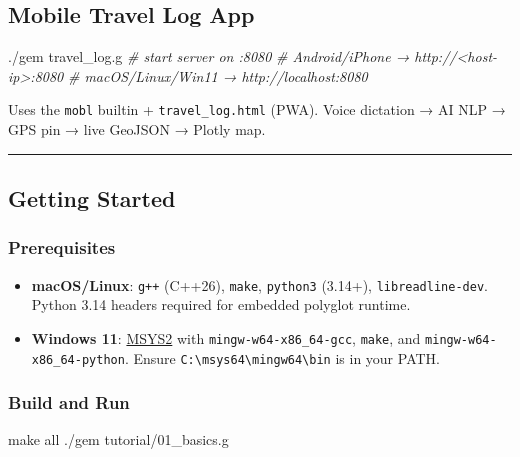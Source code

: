 \documentclass[
]{article}
\newenvironment{Shaded}{}{}
\newcommand{\CommentTok}[1]{\textcolor[rgb]{0.38,0.63,0.69}{\textit{#1}}}
\newcommand{\ExtensionTok}[1]{#1}
\newcommand{\FunctionTok}[1]{\textcolor[rgb]{0.02,0.16,0.49}{#1}}
\newcommand{\NormalTok}[1]{#1}
\providecommand{\tightlist}{%
  \setlength{\itemsep}{0pt}\setlength{\parskip}{0pt}}
\begin{document}
\subsection{Mobile Travel Log App}\label{mobile-travel-log-app}

\begin{Shaded}
\begin{Highlighting}[]
\ExtensionTok{./gem}\NormalTok{ travel\_log.g          }\CommentTok{\# start server on :8080}
\CommentTok{\# Android/iPhone → http://\textless{}host{-}ip\textgreater{}:8080}
\CommentTok{\# macOS/Linux/Win11 → http://localhost:8080}
\end{Highlighting}
\end{Shaded}

Uses the \texttt{mobl} builtin + \texttt{travel\_log.html} (PWA). Voice
dictation → AI NLP → GPS pin → live GeoJSON → Plotly map.

\begin{center}\rule{0.5\linewidth}{0.5pt}\end{center}

\subsection{Getting Started}\label{getting-started}

\subsubsection{Prerequisites}\label{prerequisites}

\begin{itemize}
\tightlist
\item
  \textbf{macOS/Linux}: \texttt{g++} (C++26), \texttt{make},
  \texttt{python3} (3.14+), \texttt{libreadline-dev}. Python 3.14
  headers required for embedded polyglot runtime.
\item
  \textbf{Windows 11}: \href{https://www.msys2.org/}{MSYS2} with
  \texttt{mingw-w64-x86\_64-gcc}, \texttt{make}, and
  \texttt{mingw-w64-x86\_64-python}. Ensure
  \texttt{C:\textbackslash{}msys64\textbackslash{}mingw64\textbackslash{}bin}
  is in your PATH.
\end{itemize}

\subsubsection{Build and Run}\label{build-and-run}

\begin{Shaded}
\begin{Highlighting}[]
\FunctionTok{make}\NormalTok{ all}
\ExtensionTok{./gem}\NormalTok{ tutorial/01\_basics.g}
\end{Highlighting}
\end{Shaded}
\end{document}
